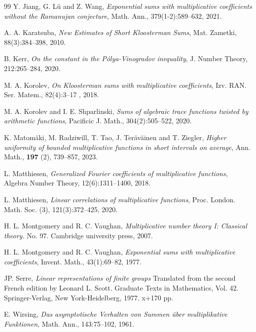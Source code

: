 \documentclass[12pt]{amsart}
\begin{document}
\begin{thebibliography}{99}
Y. Jiang, G. Lü and Z. Wang, 
\textit{Exponential sums with multiplicative coefficients without the Ramanujan conjecture},
Math. Ann., 379(1-2):589--632, 2021. 
 
A. A. Karatsuba, {\it New Estimates of Short Kloosterman Sums}, Mat. Zametki, 88(3):384--398, 2010.

B. Kerr,
\textit{On the constant in the P\'{o}lya-Vinogradov inequality},
J. Number Theory, 212:265--284, 2020. 

M. A. Korolev, {\it On Kloosterman sums with multiplicative coefficients}, Izv. RAN. Ser. Matem., 82(4):3--17 , 2018.

M. A. Korolev and I. E. Shparlinski, {\it Sums of algebraic trace functions twisted by arithmetic functions}, Pacificic  J. Math., 304(2):505--522, 2020.


K. Matom\"{a}ki, M. Radziwill, T. Tao, J. Ter\"{a}v\"{a}inen and T. Ziegler, {\it Higher uniformity of bounded multiplicative functions in short intervals on average}, Ann. Math., {\bf 197} (2), 739--857, 2023.

L. Matthiesen, 
\textit{Generalized Fourier coefficients of multiplicative functions},
Algebra Number Theory, 12(6):1311--1400, 2018. 

L. Matthiesen, {\it Linear correlations of multiplicative functions}, Proc. London. Math. Soc. (3),  121(3):372--425, 2020.

H. L. Montgomery and R. C. Vaughan,  \textit{Multiplicative number theory I: Classical theory.} No. 97. Cambridge university press, 2007.

H. L. Montgomery and R. C. Vaughan, 
\textit{Exponential sums with multiplicative coefficients},
Invent. Math., 43(1):69--82, 1977.









JP. Serre, \textit{Linear representations of finite groups} Translated from the second French edition by Leonard L. Scott. Graduate Texts in Mathematics, Vol. 42. Springer-Verlag, New York-Heidelberg, 1977. x+170 pp. 




E. Wirsing, \textit{Das asymptotische Verhalten von Summen \"uber multiplikative Funktionen}, Math. Ann., 143:75--102, 1961.



\end{thebibliography}
\end{document}
